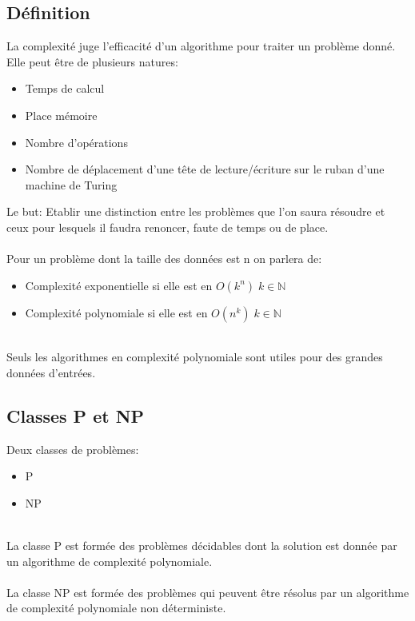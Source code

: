 \documentclass[12pt]{article}   %
\begin{document}
\subsection{Définition}
La complexité juge l’efficacité d’un algorithme pour traiter un problème donné.
\\Elle peut être de plusieurs natures:
\begin{itemize}
	\item Temps de calcul
	\item Place mémoire
	\item Nombre d’opérations
	\item Nombre de déplacement d'une tête de lecture/écriture sur le ruban d'une machine de Turing
\end{itemize}
Le but: Etablir une distinction entre les problèmes que l’on saura résoudre et ceux pour lesquels il faudra renoncer, faute de temps ou de place.
\\\\Pour un problème dont la taille des données est n on parlera de:
\begin{itemize}
	\item Complexité exponentielle si elle est en \begin{math}O(k^n) \; k\in\mathbb{N}\end{math}
	\item Complexité polynomiale si elle est en \begin{math} O(n^k) \; k\in\mathbb{N}\end{math}
\end{itemize}
~\\Seuls les algorithmes en complexité polynomiale sont utiles pour des grandes données d'entrées.
\subsection{Classes P et NP}
Deux classes de problèmes:
\begin{itemize}
	\item P
	\item NP
\end{itemize}
~\\La classe P est formée des problèmes décidables dont la solution est donnée par un algorithme de complexité polynomiale. 
\\\\La classe NP est formée des problèmes qui peuvent être résolus par un algorithme de complexité polynomiale non déterministe.

\newpage
\end{document}
